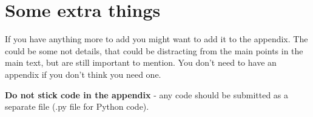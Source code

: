 \documentclass[12pt]{article}
\begin{document}
\appendix

\renewcommand{\thesection}{Appendix \Alph{section}}

\section{Some extra things}

If you have anything more to add you might want to add it to the appendix.  The could be some not details, that could be distracting from the main points in the main text, but are still important to mention.  You don't need to have an appendix if you don't think you need one.

\textbf{Do not stick code in the appendix} - any code should be submitted as a separate file (.py file for Python code).  
\end{document}
